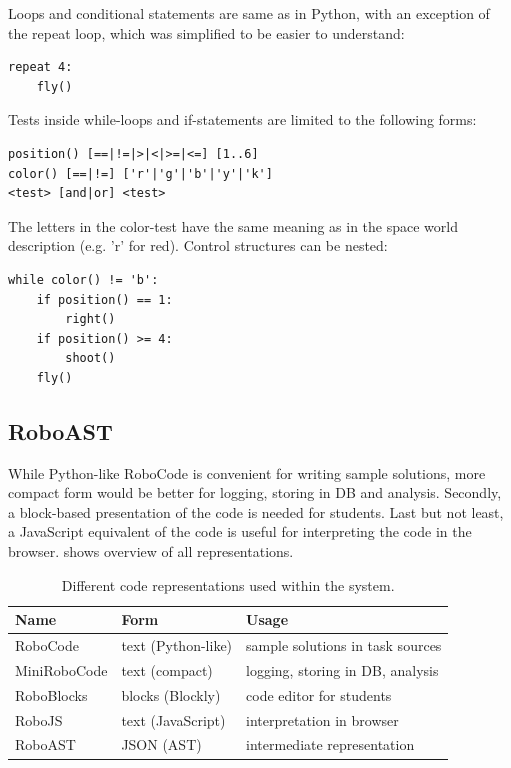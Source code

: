 Loops and conditional statements are same as in Python,
with an exception of the repeat loop,
which was simplified %
to be easier to understand: %
\begin{lstlisting}
repeat 4:
    fly()
\end{lstlisting}
Tests inside while-loops and if-statements are limited to the following forms:
\begin{lstlisting}
position() [==|!=|>|<|>=|<=] [1..6]
color() [==|!=] ['r'|'g'|'b'|'y'|'k']
<test> [and|or] <test>
\end{lstlisting}
The letters in the color-test have the same meaning as in the space world
description (e.g. 'r' for red). Control structures can be nested:
\begin{lstlisting}
while color() != 'b':
    if position() == 1:
        right()
    if position() >= 4:
        shoot()
    fly()
\end{lstlisting}


\subsection{RoboAST}

While Python-like RoboCode is convenient for writing sample solutions,
more compact form would be better for logging, storing in DB and analysis.
Secondly, a block-based presentation of the code is needed for students.
Last but not least, a JavaScript equivalent of the code is useful for
interpreting the code in the browser.
 shows overview of all representations.


\begin{table}[htb]
\centering
\begin{tabular}{l l l}
\toprule
Name & Form & Usage  \\
\midrule
RoboCode     & text (Python-like) & sample solutions in task sources  \\
MiniRoboCode & text (compact) & logging, storing in DB, analysis  \\
RoboBlocks   & blocks (Blockly) & code editor for students  \\
RoboJS       & text (JavaScript) & interpretation in browser  \\
RoboAST      & JSON (AST) & intermediate representation \\
\bottomrule
\end{tabular}
\caption{Different code representations used within the system.}
\label{tbl:code-representation}
\end{table}

